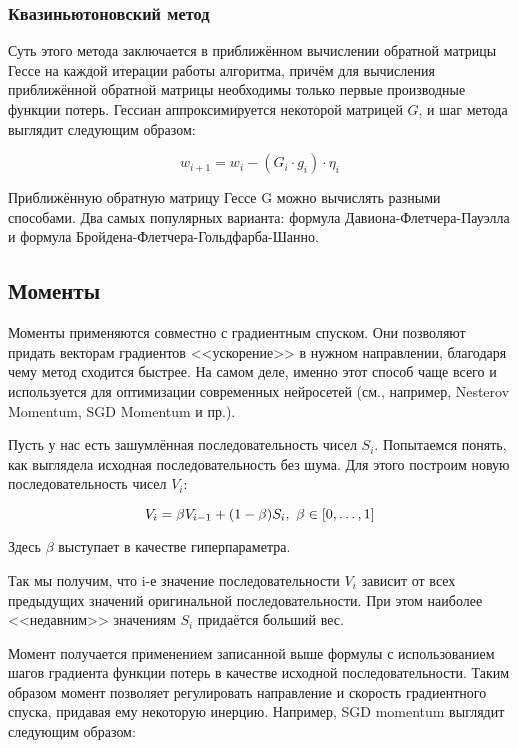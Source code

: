 \documentclass[a4paper,10pt]{article}
\theoremstyle{plain} %
\theoremstyle{definition} %
\theoremstyle{remark} %
\begin{document}
\subsubsection*{Квазиньютоновский метод}

Суть этого метода заключается в приближённом вычислении обратной матрицы Гессе на каждой итерации работы алгоритма, причём для вычисления приближённой обратной матрицы необходимы только первые производные функции потерь. Гессиан аппроксимируется некоторой матрицей $G$, и шаг метода выглядит следующим образом:

\begin{equation*}
    w_{i + 1} = w_i - (G_i \cdot g_i) \cdot \eta_i
\end{equation*}

Приближённую обратную матрицу Гессе G можно вычислять разными способами. Два самых популярных варианта: формула Давиона-Флетчера-Пауэлла и формула Бройдена-Флетчера-Гольдфарба-Шанно.

\subsection{Моменты}

Моменты применяются совместно с градиентным спуском. Они позволяют придать векторам градиентов <<ускорение>> в нужном направлении, благодаря чему метод сходится быстрее. На самом деле, именно этот способ чаще всего и используется для оптимизации современных нейросетей (см., например, Nesterov Momentum, SGD Momentum и пр.).


Пусть у нас есть зашумлённая последовательность чисел $S_i$. Попытаемся понять, как выглядела исходная последовательность без шума. Для этого построим новую последовательность чисел $V_i$:

\begin{equation*}
    V_i = \beta V_{i - 1} + (1 - \beta) S_i, \\\ \beta \in [0, \dots, 1]
\end{equation*}

Здесь $\beta$ выступает в качестве гиперпараметра.

Так мы получим, что i-е значение последовательности $V_i$ зависит от всех предыдущих значений оригинальной последовательности. При этом наиболее <<недавним>> значениям $S_i$ придаётся больший вес.

Момент получается применением записанной выше формулы с использованием шагов градиента функции потерь в качестве исходной последовательности. Таким образом момент позволяет регулировать направление и скорость градиентного спуска, придавая ему некоторую инерцию. Например, SGD momentum выглядит следующим образом:
\end{document}
